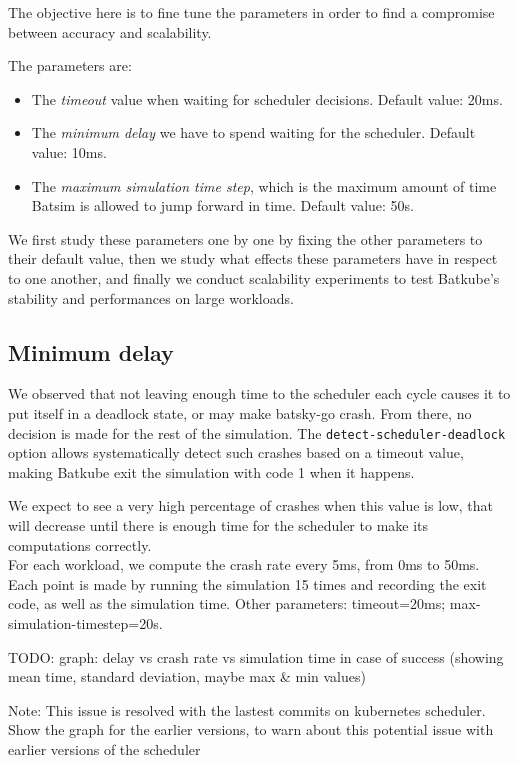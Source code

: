 \documentclass[12pt, a4paper]{memoir}
\begin{document}
The objective here is to fine tune the parameters in order to find a compromise
between accuracy and scalability.

The parameters are:
\begin{itemize}
	\item The \textit{timeout} value when waiting for scheduler decisions.
		Default value: 20ms.
	\item The \textit{minimum delay} we have to spend waiting for the
		scheduler. Default value: 10ms.
	\item The \textit{maximum simulation time step}, which is the maximum
		amount of time Batsim is allowed to jump forward in time.
		Default value: 50s.
\end{itemize}

We first study these parameters one by one by fixing the other parameters to
their default value, then we study what effects these parameters have in
respect to one another, and finally we conduct scalability experiments to test
Batkube's stability and performances on large workloads.

\subsection{Minimum delay}

We observed that not leaving enough time to the scheduler each cycle causes it
to put itself in a deadlock state, or may make batsky-go crash. From there, no
decision is made for the rest of the simulation. The
\texttt{detect-scheduler-deadlock} option allows systematically detect such
crashes based on a timeout value, making Batkube exit the simulation with code
1 when it happens.

We expect to see a very high percentage of crashes when this value is low, that
will decrease until there is enough time for the scheduler to make its
computations correctly.\\

For each workload, we compute the crash rate every 5ms, from 0ms to 50ms. Each
point is made by running the simulation 15 times and recording the exit code,
as well as the simulation time. Other parameters: timeout=20ms; max-simulation-timestep=20s.

TODO: graph: delay vs crash rate vs simulation time in case of success (showing mean time, standard deviation, maybe max \& min values)

Note: This issue is resolved with the lastest commits on kubernetes scheduler.
Show the graph for the earlier versions, to warn about this potential issue
with earlier versions of the scheduler\\
\end{document}
